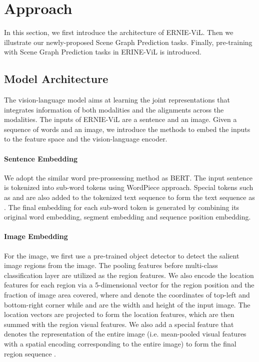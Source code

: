 \documentclass[letterpaper]{article} \usepackage{aaai21}  \usepackage{times}  \usepackage{helvet} \usepackage{courier}  \usepackage[hyphens]{url}  \usepackage{graphicx} \urlstyle{rm} \def\UrlFont{\rm}  \usepackage{natbib}  \usepackage{caption} \frenchspacing  \setlength{\pdfpagewidth}{8.5in}  \setlength{\pdfpageheight}{11in}  \usepackage{cite}
\begin{document}
\section{Approach}
 In this section, we first introduce the architecture of ERNIE-ViL. Then we  illustrate our newly-proposed Scene Graph Prediction tasks. Finally, pre-training with Scene Graph Prediction tasks in ERINE-ViL is introduced.
 
\subsection{Model Architecture}


The vision-language model aims at learning the joint representations that integrates information of both modalities and the alignments across the modalities. The inputs of ERNIE-ViL are a sentence and an image. Given a sequence of words and an image, we introduce the methods to embed the inputs to the feature space and the vision-language encoder. 



\paragraph{Sentence Embedding} We adopt the similar word pre-prossessing method as BERT. The input sentence is tokenized into sub-word tokens using WordPiece approach. Special tokens such as  and  are also added to the tokenized text sequence to form the text sequence as . The final embedding for each sub-word token is generated by combining its original word embedding, segment embedding and sequence position embedding. 


\paragraph{Image Embedding} For the image, we first use a pre-trained object detector to detect the salient image regions from the image. The pooling features before multi-class classification layer are utilized as the region features. We also encode the location features for each region via a 5-dimensional vector  for the region position and the fraction of image area covered, where  and  denote
the coordinates of top-left and bottom-right corner while  and  are the width and  height of the input image. The location vectors are projected to form the location features, which are then summed with the region visual features. We also add a special feature  that denotes the representation of the entire image (i.e. mean-pooled visual features with a spatial encoding corresponding to the entire image) to form the final region sequence . 
\end{document}
